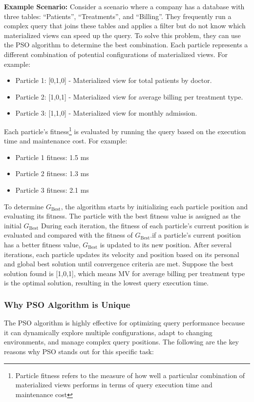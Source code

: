\textbf{Example Scenario:} Consider a scenario where a company has a database with three tables: ``Patients'', ``Treatments'', and ``Billing''. They frequently run a complex query that joins these tables and applies a filter but do not know which materialized views can speed up the query. To solve this problem, they can use the PSO algorithm to determine the best combination. Each particle represents a different combination of potential configurations of materialized views. For example:

 \begin{itemize}
     \item Particle 1: [0,1,0] - Materialized view for total patients by doctor.
     \item Particle 2: [1,0,1] - Materialized view for average billing per treatment type.
     \item Particle 3: [1,1,0] - Materialized view for monthly admission.
 \end{itemize}

Each particle's fitness\footnote{Particle fitness refers to the measure of how well a particular combination of materialized views performs in terms of query execution time and maintenance cost} is evaluated by running the query based on the execution time and maintenance cost. For example:

\begin{itemize}
     \item Particle 1 fitness: 1.5 ms
     \item Particle 2 fitness: 1.3 ms
     \item Particle 3 fitness: 2.1 ms
 \end{itemize}
 
 To determine $G_{\text{Best}}$, the algorithm starts by initializing each particle position and evaluating its fitness. The particle with the best fitness value is assigned as the initial $G_{\text{Best}}$ During each iteration, the fitness of each particle's current position is evaluated and compared with the fitness of $G_{\text{Best}}$.if a particle's current position has a better fitness value, $G_{\text{Best}}$ is updated to its new position. After several iterations, each particle updates its velocity and position based on its personal and global best solution until convergence criteria are met. Suppose the best solution found is [1,0,1], which means MV for average billing per treatment type is the optimal solution, resulting in the lowest query execution time.

\subsubsection{Why PSO Algorithm is Unique} The PSO algorithm is highly effective for optimizing query performance because it can dynamically explore multiple configurations, adapt to changing environments, and manage complex query positions. The following are the key reasons why PSO stands out for this specific task:

